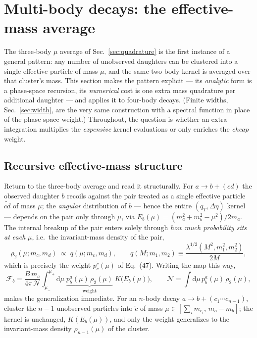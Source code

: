 \documentclass[11pt]{article}
\newcommand{\Fb}{\mathcal{F}_b}
\begin{document}
\section{Multi-body decays: the effective-mass average}
\label{sec:extensions}

The three-body $\mu$ average of Sec.~\ref{sec:quadrature} is the first
instance of a general pattern: any number of unobserved daughters can be
clustered into a single effective particle of mass $\mu$, and the same
two-body kernel is averaged over that cluster's mass.  This section makes the
pattern explicit --- its \emph{analytic} form is a phase-space recursion, its
\emph{numerical} cost is one extra mass quadrature per additional daughter
--- and applies it to four-body decays.  (Finite widths,
Sec.~\ref{sec:width}, are the very same construction with a spectral function
in place of the phase-space weight.)  Throughout, the question is whether an
extra integration multiplies the \emph{expensive} kernel evaluations or only
enriches the \emph{cheap} weight.

\subsection{Recursive effective-mass structure}
\label{sec:recursive}

Return to the three-body average and read it structurally.  For
$a\to b+(cd)$ the observed daughter $b$ recoils against the pair treated
as a single effective particle $\widetilde{cd}$ of mass $\mu$; the
\emph{angular} distribution of $b$ --- hence the entire $(q_T,\Delta\eta)$
kernel --- depends on the pair only through $\mu$, via
$E_b(\mu)=(m_a^2+m_b^2-\mu^2)/2m_a$.  The internal breakup of the pair
enters solely through \emph{how much probability sits at each} $\mu$,
i.e.\ the invariant-mass density of the pair,
\begin{equation}
\rho_2(\mu;m_c,m_d)\;\propto\;q(\mu;m_c,m_d),
\qquad
q(M;m_1,m_2)\equiv\frac{\lambda^{1/2}(M^2,m_1^2,m_2^2)}{2M},
\end{equation}
which is precisely the weight $p^{\tilde c}_c(\mu)$ of Eq.~(47).  Writing
the map this way,
\begin{equation}
\Fb=\frac{B\,m_a}{4\pi\,\mathcal N}
\int_{\mu_-}^{\mu_+}\!\mathrm{d}\mu\;
\underbrace{p^a_b(\mu)\,\rho_2(\mu)}_{\text{weight}}\;
K\big(E_b(\mu)\big),
\qquad
\mathcal N=\int\mathrm{d}\mu\,p^a_b(\mu)\,\rho_2(\mu),
\label{eq:threebody-recursive}
\end{equation}
makes the generalization immediate.  For an $n$-body decay
$a\to b+(c_1\cdots c_{n-1})$, cluster the $n-1$ unobserved particles into
$\widetilde{c}$ of mass $\mu\in[\sum_i m_{c_i},\,m_a-m_b]$; the kernel is
unchanged, $K(E_b(\mu))$, and only the weight generalizes to the
invariant-mass density $\rho_{n-1}(\mu)$ of the cluster.
\end{document}
